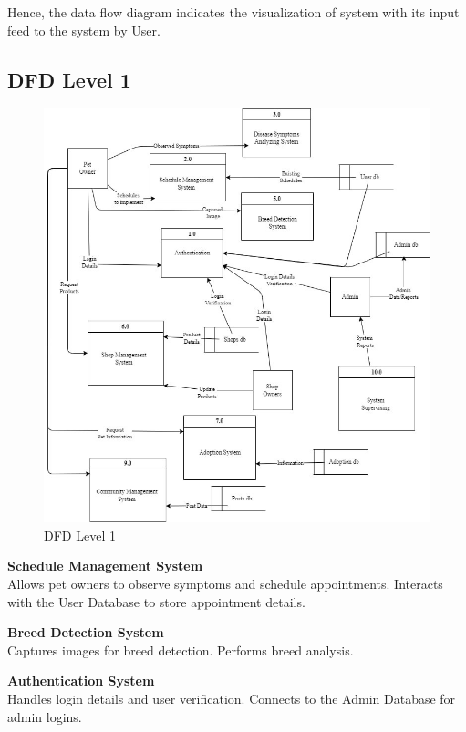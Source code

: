     \noindent Hence, the data flow diagram indicates the visualization of system with its input feed to the system by User.\\


    \subsection{DFD Level 1}
    \vspace{2cm}
    \begin{figure}[H]
    \centering
    \includegraphics[width=0.95\linewidth]{img/dfd_1.jpg}
    \caption[DFD Level 1]{DFD Level 1}
    \label{fig:dfd-level1}
    \end{figure}
    \textbf{Schedule Management System}\\
        Allows pet owners to observe symptoms and schedule appointments.
        Interacts with the User Database to store appointment details.
    
    \textbf{Breed Detection System}\\
        Captures images for breed detection.
        Performs breed analysis.
    
    \textbf{Authentication System}\\
        Handles login details and user verification.
        Connects to the Admin Database for admin logins.
    
